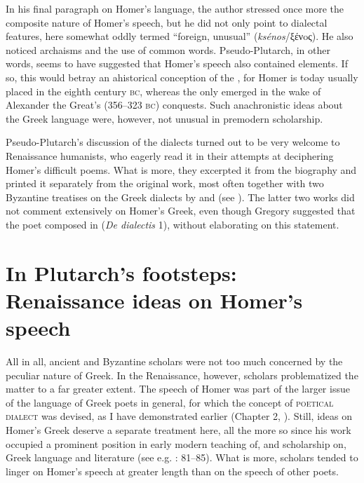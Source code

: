 In his final paragraph on Homer’s language, the author stressed once more the composite nature of Homer’s speech, but he did not only point to dialectal features, here somewhat oddly termed “foreign, unusual” (\textit{ksénos}/ξένoς). He also noticed archaisms and the use of common words. Pseudo-Plutarch, in other words, seems to have suggested that Homer’s speech also contained  elements. If so, this would betray an ahistorical conception of the , for Homer is today usually placed in the eighth century \textsc{bc}, whereas the  only emerged in the wake of Alexander the Great’s (356–323 \textsc{bc}) conquests. Such anachronistic ideas about the Greek language were, however, not unusual in premodern scholarship.

Pseudo-Plutarch’s discussion of the dialects turned out to be very welcome to Renaissance humanists, who eagerly read it in their attempts at deciphering Homer’s difficult poems. What is more, they excerpted it from the biography and printed it separately from the original work, most often together with two Byzantine treatises on the Greek dialects by  and  (see \citealt{VanRooy2018c}). The latter two works did not comment extensively on Homer’s Greek, even though Gregory suggested that the poet composed in  (\textit{De dialectis} 1), without elaborating on this statement.

\section{In Plutarch’s footsteps: Renaissance ideas on Homer’s speech}\label{sec:4.2}

All in all, ancient and Byzantine scholars were not too much concerned by the peculiar nature of  Greek. In the Renaissance, however, scholars problematized the matter to a far greater extent. The speech of Homer was part of the larger issue of the language of Greek poets in general, for which the concept of \textsc{poetical} \textsc{dialect} was devised, as I have demonstrated earlier (Chapter 2, ). Still, ideas on Homer’s Greek deserve a separate treatment here, all the more so since his work occupied a prominent position in early modern teaching of, and scholarship on, Greek language and literature (see e.g. \citealt{Botley2010}: 81–85). What is more, scholars tended to linger on Homer’s speech at greater length than on the speech of other poets.

